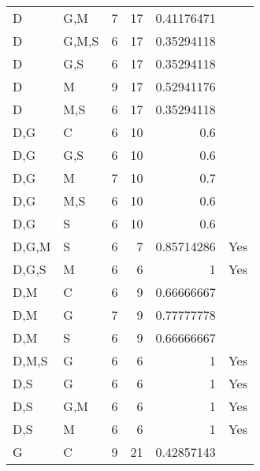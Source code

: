 \documentclass[10pt]{article}
\begin{document}
\begin{table}[htb]
\begin{center}
\begin{tabular}{llrrrl}
 D      &  G,M    &          7  &         17  &             0.41176471  &                \\
 D      &  G,M,S  &          6  &         17  &             0.35294118  &                \\
 D      &  G,S    &          6  &         17  &             0.35294118  &                \\
 D      &  M      &          9  &         17  &             0.52941176  &                \\
 D      &  M,S    &          6  &         17  &             0.35294118  &                \\
 D,G    &  C      &          6  &         10  &                    0.6  &                \\
 D,G    &  G,S    &          6  &         10  &                    0.6  &                \\
 D,G    &  M      &          7  &         10  &                    0.7  &                \\
 D,G    &  M,S    &          6  &         10  &                    0.6  &                \\
 D,G    &  S      &          6  &         10  &                    0.6  &                \\
 D,G,M  &  S      &          6  &          7  &             0.85714286  &  Yes           \\
 D,G,S  &  M      &          6  &          6  &                      1  &  Yes           \\
 D,M    &  C      &          6  &          9  &             0.66666667  &                \\
 D,M    &  G      &          7  &          9  &             0.77777778  &                \\
 D,M    &  S      &          6  &          9  &             0.66666667  &                \\
 D,M,S  &  G      &          6  &          6  &                      1  &  Yes           \\
 D,S    &  G      &          6  &          6  &                      1  &  Yes           \\
 D,S    &  G,M    &          6  &          6  &                      1  &  Yes           \\
 D,S    &  M      &          6  &          6  &                      1  &  Yes           \\
 G      &  C      &          9  &         21  &             0.42857143  &                \\

\end{tabular}
\end{center}
\end{table}
\end{document}

